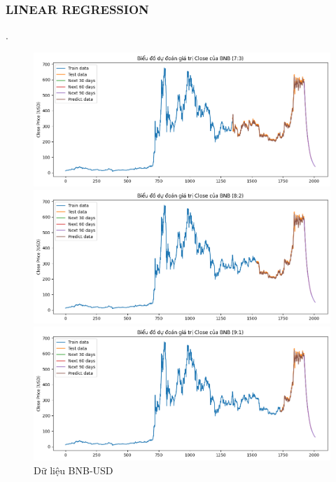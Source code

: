 \documentclass[conference]{IEEEtran}
\begin{document}
	\subsubsection{LINEAR REGRESSION}.
	\begin{figure}[H]
		\centering
		\begin{minipage}{0.15\textwidth}
			\centering
			\includegraphics[width=1\textwidth]{Figure/LN_BNB_73.png}
		\end{minipage}
		\hfill
		\begin{minipage}{0.15\textwidth}
			\centering
			\includegraphics[width=1\textwidth]{Figure/LN_BNB_82.png}
		\end{minipage}
		\hfill
		\begin{minipage}{0.15\textwidth}
			\centering
			\includegraphics[width=1\textwidth]{Figure/LN_BNB_91.png}
		\end{minipage}
		\caption{Dữ liệu BNB-USD}
		\label{fig:1}
	\end{figure}
\end{document}

